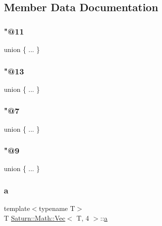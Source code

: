 \subsection{Member Data Documentation}
\mbox{\label{class_saturn_1_1_math_1_1_vec_3_01_t_00_014_01_4_a542cb5445340a22922b16365e8424568}} 
\subsubsection{\texorpdfstring{"@11}{@11}}
{\footnotesize\ttfamily union \{ ... \} }

\mbox{\label{class_saturn_1_1_math_1_1_vec_3_01_t_00_014_01_4_ab8152bf9ceaa73f7984af4ffffd77fa4}} 
\subsubsection{\texorpdfstring{"@13}{@13}}
{\footnotesize\ttfamily union \{ ... \} }

\mbox{\label{class_saturn_1_1_math_1_1_vec_3_01_t_00_014_01_4_adc4f532694fca20a5307e828c76e0692}} 
\subsubsection{\texorpdfstring{"@7}{@7}}
{\footnotesize\ttfamily union \{ ... \} }

\mbox{\label{class_saturn_1_1_math_1_1_vec_3_01_t_00_014_01_4_a8654c7b3da9a23133fcd157b7d198b19}} 
\subsubsection{\texorpdfstring{"@9}{@9}}
{\footnotesize\ttfamily union \{ ... \} }

\mbox{\label{class_saturn_1_1_math_1_1_vec_3_01_t_00_014_01_4_a3f7fc158e650010e17ad1a7d830089da}} 
\subsubsection{\texorpdfstring{a}{a}}
{\footnotesize\ttfamily template$<$typename T$>$ \\
T \mbox{\hyperlink{class_saturn_1_1_math_1_1_vec}{Saturn\+::\+Math\+::\+Vec}}$<$ T, 4 $>$\+::\mbox{\hyperlink{glad_8h_ac8729153468b5dcf13f971b21d84d4e5}{a}}}

